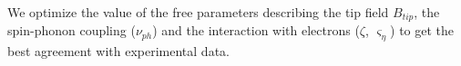 \documentclass[
reprint,amsmath,amssymb,aps]{revtex4-2}
\begin{document}

We optimize the value of the free parameters describing the tip field $B_{tip}$, the spin-phonon coupling ($\nu_{ph}$) and the interaction with electrons ($\zeta$, $\varsigma_{\eta}$) to get the best agreement with experimental data.
\end{document}
